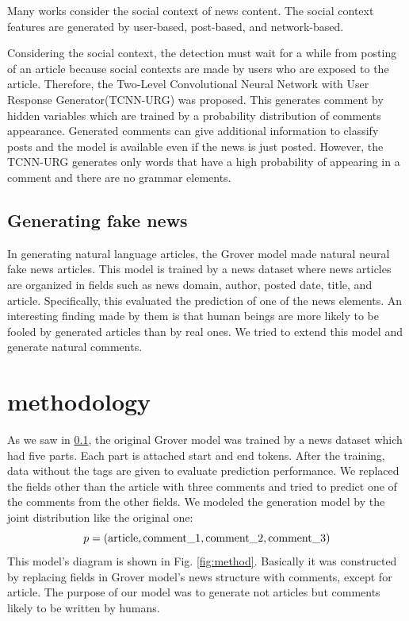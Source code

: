 \documentclass[conference]{IEEEtran}
\begin{document}
Many works consider the social context of news content.
The social context features are generated by user-based\cite{Castillo:2011:ICT:1963405.1963500,8397048,DBLP:journals/corr/abs-1904-13355}, 
post-based\cite{Yang2019UnsupervisedFN,Tacchini2017SomeLI,Jin:2016:NVE:3016100.3016318},
 and network-based\cite{Wu:2018:TFF:3159652.3159677,DBLP:journals/corr/abs-1902-06673}.

Considering the social context, the detection must wait for a while from posting of an article because social contexts are made by users who are exposed to the article.
Therefore, the Two-Level Convolutional Neural Network with User Response Generator(TCNN-URG) was proposed\cite{ijcai2018-533}.
This generates comment by hidden variables which are trained by a probability distribution of comments appearance.
Generated comments can give additional information to classify posts and the model is available even if the news is just posted.
However, the TCNN-URG generates only words that have a high probability of appearing in a comment and there are no grammar elements.

\subsection{Generating fake news}
\label{subsec:generate}
In generating natural language articles, the Grover model made natural neural fake news articles\cite{NIPS2019_9106}.
This model is trained by a news dataset where news articles are organized in fields such as news domain, author, posted date, title, and article.
Specifically, this evaluated the prediction of one of the news elements.
An interesting finding made by them is that human beings are more likely to be fooled by generated articles than by real ones.
We tried to extend this model and generate natural comments.
\section{methodology}
As we saw in \ref{subsec:generate}, the original Grover model was trained by a news dataset which had five parts.
Each part is attached start and end tokens.
After the training, data without the tags are given to evaluate prediction performance.
We replaced the fields other than the article with three comments and tried to predict one of the comments from the other fields.
We modeled the generation model by the joint distribution like the original one:
\begin{equation}
    \label{eq:joint_distri}
    p = (\rm{article}, \rm{comment\_1}, \rm{comment\_2}, \rm{comment\_3})
\end{equation}
This model's diagram is shown in Fig. \ref{fig:method}.
Basically it was constructed by replacing fields in Grover model’s news structure with comments, except for article.
The purpose of our model was to generate not articles but comments likely to be written by humans.
\end{document}
